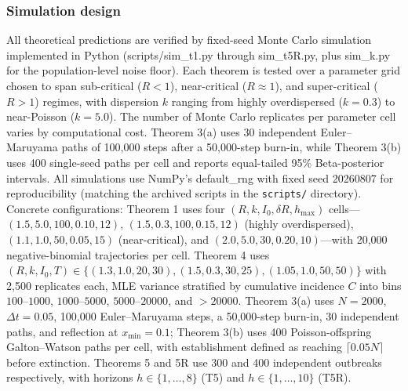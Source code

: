 \documentclass[review]{elsarticle}
\theoremstyle{plain}
\theoremstyle{definition}
\begin{document}
\subsubsection{Simulation design}\label{sec:simulation}

All theoretical predictions are verified by fixed-seed Monte Carlo simulation implemented in Python (scripts/sim\_t1.py through sim\_t5R.py, plus sim\_k.py for the population-level noise floor). Each theorem is tested over a parameter grid chosen to span sub-critical ($R < 1$), near-critical ($R \approx 1$), and super-critical ($R > 1$) regimes, with dispersion $k$ ranging from highly overdispersed ($k = 0.3$) to near-Poisson ($k = 5.0$). The number of Monte Carlo replicates per parameter cell varies by computational cost. Theorem 3(a) uses 30 independent Euler--Maruyama paths of 100,000 steps after a 50,000-step burn-in, while Theorem 3(b) uses 400 single-seed paths per cell and reports equal-tailed 95\% Beta-posterior intervals. All simulations use NumPy's default\_rng with fixed seed 20260807 for reproducibility (matching the archived scripts in the \texttt{scripts/} directory). Concrete configurations: Theorem 1 uses four $(R, k, I_0, \delta R, h_{\max})$ cells---$(1.5, 5.0, 100, 0.10, 12)$, $(1.5, 0.3, 100, 0.15, 12)$ (highly overdispersed), $(1.1, 1.0, 50, 0.05, 15)$ (near-critical), and $(2.0, 5.0, 30, 0.20, 10)$---with 20,000 negative-binomial trajectories per cell. Theorem 4 uses $(R, k, I_0, T) \in \{(1.3, 1.0, 20, 30), (1.5, 0.3, 30, 25), (1.05, 1.0, 50, 50)\}$ with 2,500 replicates each, MLE variance stratified by cumulative incidence $C$ into bins $100\text{--}1000$, $1000\text{--}5000$, $5000\text{--}20000$, and $>20000$. Theorem 3(a) uses $N=2000$, $\Delta t=0.05$, 100,000 Euler--Maruyama steps, a 50,000-step burn-in, 30 independent paths, and reflection at $x_{\min}=0.1$; Theorem 3(b) uses 400 Poisson-offspring Galton--Watson paths per cell, with establishment defined as reaching $\lceil0.05N\rceil$ before extinction. Theorems 5 and 5R use 300 and 400 independent outbreaks respectively, with horizons $h \in \{1, \dots, 8\}$ (T5) and $h \in \{1, \dots, 10\}$ (T5R).
\end{document}

